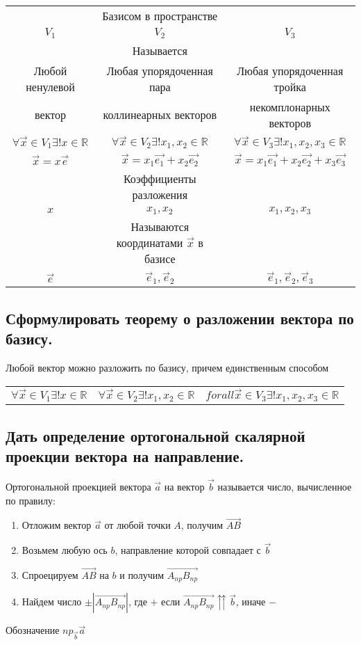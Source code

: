 \documentclass[a4paper, 10pt]{article}
\newcommand{\bvec}[1]{\overrightarrow{#1}}
\newcommand{\mcolt}[1]{&#1&}
\begin{document}
\begin{center}
\begin{tabular}{c c c} 
    \mcolt{Базисом в пространстве}\\
    $V_1$&$V_2$&$V_3$\\
    \mcolt{Называется}\\
    Любой ненулевой & Любая упорядоченная пара & Любая упорядоченная тройка\\
    вектор & коллинеарных векторов & некомплонарных векторов\\
    $\forall \vec{x} \in V_1 \exists ! x \in \mathbb{R}$&
    $\forall \vec{x} \in V_2 \exists ! x_1, x_2 \in \mathbb{R}$&
    $\forall \vec{x} \in V_3 \exists ! x_1, x_2, x_3 \in \mathbb{R}$\\
    $\vec{x} = x\vec{e}$ & $\vec{x} = x_1\vec{e_1} + x_2\vec{e_2}$ &
    $\vec{x} = x_1\vec{e_1} + x_2\vec{e_2} + x_3\vec{e_3}$\\
    \mcolt{Коэффициенты разложения}\\
    $x$&$x_1, x_2$&$x_1, x_2, x_3$\\
    \mcolt{Называются координатами $\vec{x}$ в базисе}\\
    $\vec{e}$&$\vec{e}_1, \vec{e}_2$&$\vec{e}_1, \vec{e}_2, \vec{e}_3$\\
\end{tabular}
\end{center}

\subsection{Сформулировать теорему о разложении вектора по базису.}

\begin{center}
Любой вектор можно разложить по базису, причем единственным способом
\begin{tabular}{c c c} 
    $\forall \vec{x} \in V_1 \exists ! x \in \mathbb{R}$&
    $\forall \vec{x} \in V_2 \exists ! x_1, x_2 \in \mathbb{R}$&
    $forall \vec{x} \in V_3 \exists ! x_1, x_2, x_3 \in \mathbb{R}$\\
\end{tabular}
\end{center}

\subsection{Дать определение ортогональной скалярной проекции вектора на направление.}

Ортогональной проекцией вектора $\vec{a}$ на вектор $\vec{b}$ называется число, вычисленное по правилу:
\begin{enumerate}
    \item Отложим вектор $\vec{a}$ от любой точки $A$, получим $\bvec{AB}$
    \item Возьмем любую ось $b$, направление которой совпадает с $\vec{b}$
    \item Спроецируем $\bvec{AB}$ на $b$ и получим  $\bvec{A_{np}B_{np}}$
    \item Найдем число $\pm |\bvec{A_{np}B_{np}}|$, где $+$ если $\bvec{A_{np}B_{np}} \upuparrows \vec{b}$, иначе $-$
\end{enumerate}
Обозначение $np_{\vec{b}} \vec{a}$
\end{document}
